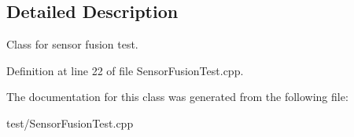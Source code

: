 \subsection{Detailed Description}
Class for sensor fusion test. 

Definition at line 22 of file Sensor\+Fusion\+Test.\+cpp.



The documentation for this class was generated from the following file\+:\begin{DoxyCompactItemize}
\item 
test/Sensor\+Fusion\+Test.\+cpp\end{DoxyCompactItemize}
